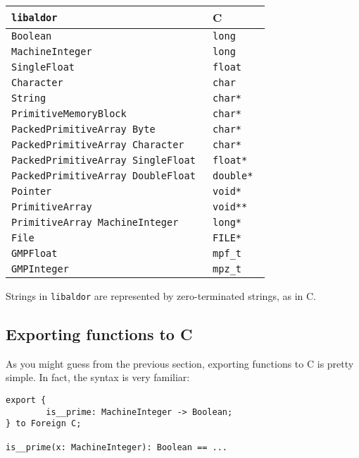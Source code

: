 \documentclass{article}
\newcommand{\libaldor}{{\tt libaldor}}
\begin{document}
\begin{table}[ht]
\begin{center}
\begin{tabular}{|ll|} \hline
\libaldor{} & C \\ \hline
\tt{Boolean} & \tt{long} \\
\tt{MachineInteger} & \tt{long} \\
\tt{SingleFloat} & \tt{float} \\
\tt{Character} & \tt{char} \\
\tt{String} & \tt{char*} \\
\tt{PrimitiveMemoryBlock} & \tt{char*} \\
\tt{PackedPrimitiveArray} \tt{Byte} & \tt{char*} \\
\tt{PackedPrimitiveArray} \tt{Character} & \tt{char*} \\
\tt{PackedPrimitiveArray} \tt{SingleFloat} & \tt{float*} \\
\tt{PackedPrimitiveArray} \tt{DoubleFloat} & \tt{double*} \\
\tt{Pointer} & \tt{void*} \\
\tt{PrimitiveArray} & \tt{void**} \\
\tt{PrimitiveArray} \tt{MachineInteger} & \tt{long*} \\
\tt{File} & \tt{FILE*} \\
\tt{GMPFloat} & \tt{mpf\_t}\\
\tt{GMPInteger} & \tt{mpz\_t} \\ \hline
\end{tabular}
\end{center}
\end{table}

Strings in \libaldor{} are represented by zero-terminated strings, as in C.

\subsection{Exporting functions to C}

As you might guess from the previous section, exporting functions to C
is pretty simple.  In fact, the syntax is very familiar:
\begin{small}
\begin{verbatim}
export {
        is__prime: MachineInteger -> Boolean;
} to Foreign C;

is__prime(x: MachineInteger): Boolean == ...
\end{verbatim}
\end{small}
\end{document}

